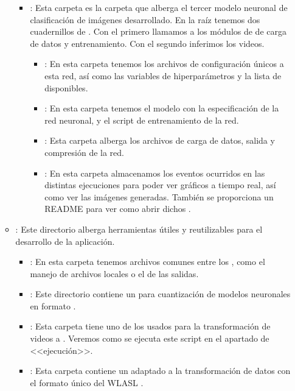 \begin{itemize}
\begin{itemize}
\begin{itemize}
                  \item {}: Esta carpeta es la carpeta que alberga el tercer modelo neuronal de clasificación de imágenes desarrollado. En la raíz tenemos dos cuadernillos de . Con el primero llamamos a los módulos de  de carga de datos y entrenamiento. Con el segundo inferimos los videos.
                        \begin{itemize}
                          \item {}: En esta carpeta tenemos los archivos de configuración únicos a esta red, así como las variables de hiperparámetros y la lista de  disponibles.
                          \item {}: En esta carpeta tenemos el modelo con la especificación de la red neuronal, y el script de entrenamiento de la red.
                          \item {}: Esta carpeta alberga los archivos de carga de datos, salida y compresión de la red.
                          \item {}: En esta carpeta almacenamos los eventos ocurridos en las distintas ejecuciones para poder ver gráficos a tiempo real, así como ver las imágenes generadas. También se proporciona un README para ver como abrir dichos .
                        \end{itemize}
                \end{itemize}

          \item {}: Este directorio alberga herramientas útiles y reutilizables para el desarrollo de la aplicación.
                \begin{itemize}
                  \item {}: En esta carpeta tenemos archivos comunes entre los , como el manejo de archivos locales o el  de las salidas.

                  \item {}: Este directorio contiene un  para cuantización de modelos neuronales en formato .

                  \item {}: Esta carpeta tiene uno de los  usados para la transformación de videos a . Veremos como se ejecuta este script en el apartado de <<ejecución>>.

                  \item {}: Esta carpeta contiene un  adaptado a la transformación de datos con el formato único del  WLASL .
                \end{itemize}
        \end{itemize}

\end{itemize}

